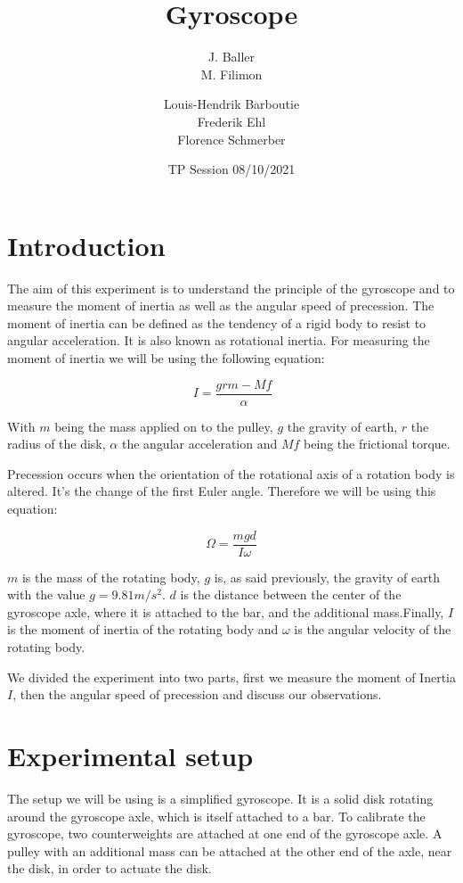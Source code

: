 \documentclass{scrartcl}
\title{Gyroscope}
\subtitle{J. Baller \\ M. Filimon}
\date{TP Session 08/10/2021}
\author{Louis-Hendrik Barboutie \\ Frederik Ehl \\ Florence Schmerber}
\begin{document}
\maketitle

\clearpage

\tableofcontents
	
\clearpage

\section{Introduction}

The aim of this experiment is to understand the principle of the gyroscope and to measure the moment of inertia as well as the angular speed of precession. The moment of inertia can be defined as the tendency of a rigid body to resist to angular acceleration. It is also known as rotational inertia. For measuring the moment of inertia we will be using the following equation: 

\begin{equation}
	\ I = \frac{grm-Mf}{ \alpha}
	\label{eq1}
\end{equation}

With $m$ being the mass applied on to the pulley, $g$ the gravity of earth, $r$ the radius of the disk, $\alpha$ the angular acceleration and $Mf$ being the frictional torque. 
\newline

Precession occurs when the orientation of the rotational axis of a rotation body is altered. It's the change of the first Euler angle.
Therefore we will be using this equation:

\begin{equation}
	\Omega = \frac{mgd}{I \omega}
	\label{eq2}
\end{equation}

$m$ is the mass of the rotating body, $g$ is, as said previously, the gravity of earth with the value $g=9.81 m/s^{2}$. $d$ is the distance between the center of the gyroscope axle, where it is attached to the bar, and the additional mass.Finally, $I$ is the moment of inertia of the rotating body and $\omega$ is the angular velocity of the rotating body.
\newline

We divided the experiment into two parts, first we measure the moment of Inertia $I$, then the angular speed of precession and discuss our observations.

\section{Experimental setup}
The setup we will be using is a simplified gyroscope. It is a solid disk rotating around the gyroscope axle, which is itself attached to a bar. To calibrate the gyroscope, two counterweights are attached at one end of the gyroscope axle. A pulley with an additional mass can be attached at the other end of the axle, near the disk, in order to actuate the disk.
\end{document}

